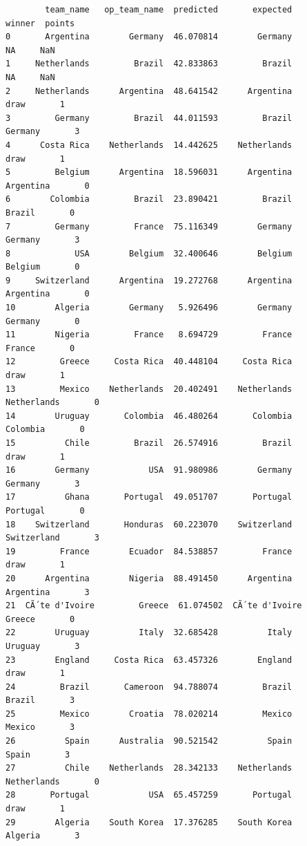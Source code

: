 \documentclass[12pt,fleqn]{article}\usepackage{../../common}
\begin{document}
\begin{verbatim}
        team_name   op_team_name  predicted       expected         winner  points
0       Argentina        Germany  46.070814        Germany             NA     NaN
1     Netherlands         Brazil  42.833863         Brazil             NA     NaN
2     Netherlands      Argentina  48.641542      Argentina           draw       1
3         Germany         Brazil  44.011593         Brazil        Germany       3
4      Costa Rica    Netherlands  14.442625    Netherlands           draw       1
5         Belgium      Argentina  18.596031      Argentina      Argentina       0
6        Colombia         Brazil  23.890421         Brazil         Brazil       0
7         Germany         France  75.116349        Germany        Germany       3
8             USA        Belgium  32.400646        Belgium        Belgium       0
9     Switzerland      Argentina  19.272768      Argentina      Argentina       0
10        Algeria        Germany   5.926496        Germany        Germany       0
11        Nigeria         France   8.694729         France         France       0
12         Greece     Costa Rica  40.448104     Costa Rica           draw       1
13         Mexico    Netherlands  20.402491    Netherlands    Netherlands       0
14        Uruguay       Colombia  46.480264       Colombia       Colombia       0
15          Chile         Brazil  26.574916         Brazil           draw       1
16        Germany            USA  91.980986        Germany        Germany       3
17          Ghana       Portugal  49.051707       Portugal       Portugal       0
18    Switzerland       Honduras  60.223070    Switzerland    Switzerland       3
19         France        Ecuador  84.538857         France           draw       1
20      Argentina        Nigeria  88.491450      Argentina      Argentina       3
21  CÃ´te d'Ivoire         Greece  61.074502  CÃ´te d'Ivoire         Greece       0
22        Uruguay          Italy  32.685428          Italy        Uruguay       3
23        England     Costa Rica  63.457326        England           draw       1
24         Brazil       Cameroon  94.788074         Brazil         Brazil       3
25         Mexico        Croatia  78.020214         Mexico         Mexico       3
26          Spain      Australia  90.521542          Spain          Spain       3
27          Chile    Netherlands  28.342133    Netherlands    Netherlands       0
28       Portugal            USA  65.457259       Portugal           draw       1
29        Algeria    South Korea  17.376285    South Korea        Algeria       3

\end{verbatim}
\end{document}
